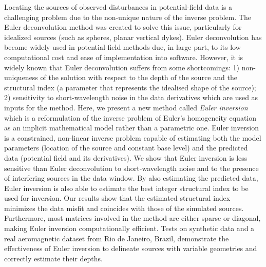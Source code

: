 Locating the sources of observed disturbances in potential-field data is a challenging problem due to the non-unique nature of the inverse problem.
The Euler deconvolution method was created to solve this issue, particularly for idealized sources (such as spheres, planar vertical dykes).
Euler deconvolution has become widely used in potential-field methods due, in large part, to its low computational cost and ease of implementation into software.
However, it is widely known that Euler deconvolution suffers from some shortcomings: 1) non-uniqueness of the solution with respect to the depth of the source and the structural index (a parameter that represents the idealised shape of the source); 2) sensitivity to short-wavelength noise in the data derivatives which are used as inputs for the method.
Here, we present a new method called \textit{Euler inversion} which is a reformulation of the inverse problem of Euler's homogeneity equation as an implicit mathematical model rather than a parametric one.
Euler inversion is a constrained, non-linear inverse problem capable of estimating both the model parameters (location of the source and constant base level) and the predicted data (potential field and its derivatives).
We show that Euler inversion is less sensitive than Euler deconvolution to short-wavelength noise and to the presence of interfering sources in the data window.
By also estimating the predicted data, Euler inversion is also able to estimate the best integer structural index 
to be used for inversion.
Our results show that the estimated structural index minimizes the data misfit and coincides with those of the simulated sources. 
Furthermore, most matrices involved in the method are either sparse or diagonal, making Euler inversion computationally efficient.
Tests on synthetic data and a real aeromagnetic dataset from Rio de Janeiro, Brazil, demonstrate the effectiveness of Euler inversion to delineate sources with variable geometries and correctly estimate their depths.
